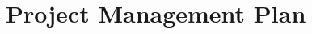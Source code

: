 \documentclass{report}
\begin{document}
\chapter{Project Management Plan}\label{ch:project-management-plan}
\end{document}
